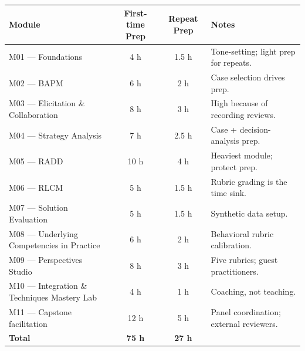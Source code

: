 \documentclass[11pt,letterpaper,oneside]{report}
\begin{document}
\clearpage
\begin{tcolorbox}[callout,colback=afpaper,colframe=afnavy,colbacktitle=afnavy,
  title=Instructor Preparation Effort by Module]
\begin{tabularx}{\linewidth}{@{}R{6.0cm} c c >{\RaggedRight\arraybackslash}X@{}}
\toprule
\sffamily\bfseries Module & \sffamily\bfseries First-time Prep & \sffamily\bfseries Repeat Prep & \sffamily\bfseries Notes \\
\midrule
M01 --- Foundations                                  &  4 h & 1.5 h & Tone-setting; light prep for repeats. \\
M02 --- BAPM                                          &  6 h & 2 h   & Case selection drives prep. \\
M03 --- Elicitation \& Collaboration                  &  8 h & 3 h   & High because of recording reviews. \\
M04 --- Strategy Analysis                             &  7 h & 2.5 h & Case + decision-analysis prep. \\
M05 --- RADD                                          & 10 h & 4 h   & Heaviest module; protect prep. \\
M06 --- RLCM                                          &  5 h & 1.5 h & Rubric grading is the time sink. \\
M07 --- Solution Evaluation                           &  5 h & 1.5 h & Synthetic data setup. \\
M08 --- Underlying Competencies in Practice           &  6 h & 2 h   & Behavioral rubric calibration. \\
M09 --- Perspectives Studio                           &  8 h & 3 h   & Five rubrics; guest practitioners. \\
M10 --- Integration \& Techniques Mastery Lab         &  4 h & 1 h   & Coaching, not teaching. \\
M11 --- Capstone facilitation                         & 12 h & 5 h   & Panel coordination; external reviewers. \\
\midrule
\textbf{Total}                                       & \textbf{75 h} & \textbf{27 h} & \\
\bottomrule
\end{tabularx}
\end{tcolorbox}
\end{document}
